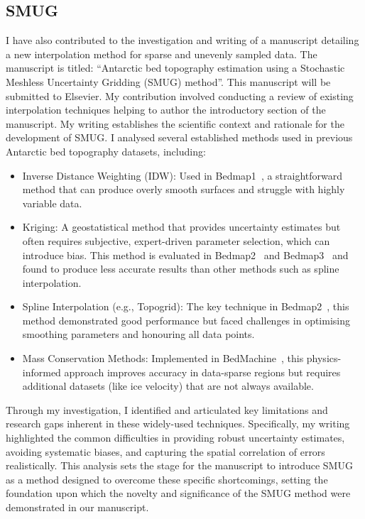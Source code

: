 \newpage
\subsection{SMUG}
I have also contributed to the investigation and writing of a manuscript detailing a new interpolation method for sparse and unevenly sampled data. The manuscript is titled: ``Antarctic bed topography estimation using a Stochastic Meshless Uncertainty Gridding (SMUG) method''. This manuscript will be submitted to Elsevier.
My contribution involved conducting a review of existing interpolation techniques helping to author the introductory section of the manuscript. My writing establishes the scientific context and rationale for the development of SMUG. I analysed several established methods used in previous Antarctic bed topography datasets, including:

\begin{itemize}
    \item{Inverse Distance Weighting (IDW)}: Used in Bedmap1~\cite{Lythe_2001}, a straightforward method that can produce overly smooth surfaces and struggle with highly variable data.

    \item{Kriging}: A geostatistical method that provides uncertainty estimates but often requires subjective, expert-driven parameter selection, which can introduce bias. This method is evaluated in Bedmap2~\cite{Fretwell_2013} and Bedmap3~\cite{Pritchard_2025} and found to produce less accurate results than other methods such as spline interpolation.

    \item{Spline Interpolation (e.g., Topogrid)}: The key technique in Bedmap2~\cite{Fretwell_2013}, this method demonstrated good performance but faced challenges in optimising smoothing parameters and honouring all data points.

    \item{Mass Conservation Methods}: Implemented in BedMachine~\cite{Morlighem_2020}, this physics-informed approach improves accuracy in data-sparse regions but requires additional datasets (like ice velocity) that are not always available.
\end{itemize}
Through my investigation, I identified and articulated key limitations and research gaps inherent in these widely-used techniques. Specifically, my writing highlighted the common difficulties in providing robust uncertainty estimates, avoiding systematic biases, and capturing the spatial correlation of errors realistically. This analysis sets the stage for the manuscript to introduce SMUG as a method designed to overcome these specific shortcomings, setting the foundation upon which the novelty and significance of the SMUG method were demonstrated in our manuscript.

